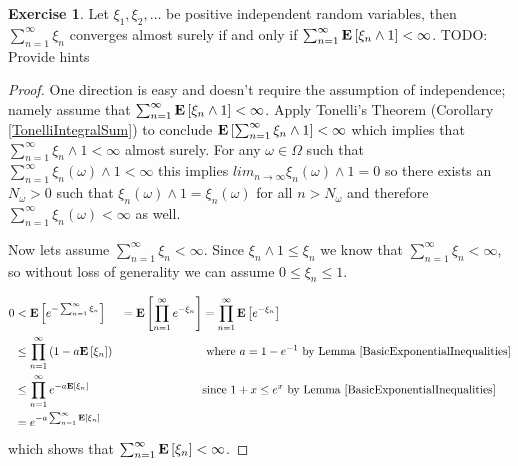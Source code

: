 \documentclass{amsart}
\theoremstyle{remark}
\theoremstyle{definition}
\newtheorem{ex}[thm]{Exercise}
\begin{document}
\begin{ex}Let $\xi_1, \xi_2, \dots$ be positive independent random
  variables, then $\sum_{n=1}^\infty \xi_n$ converges almost surely if
  and only if $\sum_{n=1}^\infty \textbf{E}\left[\xi_n \wedge 1\right] <
  \infty$.
TODO: Provide hints
\end{ex}
\begin{proof}One direction is easy and doesn't require the assumption
  of independence; namely assume that $\sum_{n=1}^\infty
  \textbf{E}\left[\xi_n \wedge 1\right] < \infty$.
Apply Tonelli's Theorem (Corollary \ref{TonelliIntegralSum}) to
conclude $\textbf{E}\left[\sum_{n=1}^\infty \xi_n \wedge 1\right] < \infty $
which implies that $\sum_{n=1}^\infty \xi_n \wedge 1 < \infty$ almost
surely.  For any $\omega \in \Omega$ such that $\sum_{n=1}^\infty
\xi_n(\omega) \wedge 1 < \infty$ this implies $lim_{n \to \infty}
\xi_n(\omega) \wedge 1 = 0$ so there exists an $N_\omega > 0$ such
that $\xi_n(\omega) \wedge 1 = \xi_n(\omega)$  for all $n>N_\omega$ 
and therefore $\sum_{n=1}^\infty\xi_n(\omega) < \infty$ as
well.

Now lets assume $\sum_{n=1}^\infty \xi_n < \infty$.  Since $\xi_n
\wedge 1 \leq \xi_n$ we know that $\sum_{n=1}^\infty \xi_n < \infty$, 
so without loss of generality we
can assume $0 \leq \xi_n \leq 1$.

\begin{align*}
0 &< \textbf{E}\left[e^{-\sum_{n=1}^\infty \xi_n}\right] 
&=\textbf{E}\left[\prod_{n=1}^\infty e^{-\xi_n}\right] 
&= \prod_{n=1}^\infty \textbf{E}\left[ e^{-\xi_n}\right] \\
&\leq \prod_{n=1}^\infty \left ( 1 - a\textbf{E}\left[\xi_n\right] \right ) &
&\text{ where $a=1-e^{-1}$ by Lemma
  \ref{BasicExponentialInequalities}} \\
&\leq \prod_{n=1}^\infty e^{- a\textbf{E}\left[\xi_n\right] } & & \text{since
  $1+x\leq e^x$ by Lemma \ref{BasicExponentialInequalities}} \\
&= e^{-a \sum_{n=1}^\infty \textbf{E}\left[\xi_n\right] }
\end{align*}
which shows that $\sum_{n=1}^\infty \textbf{E}\left[\xi_n\right] < \infty$.
\end{proof}
\end{document}

